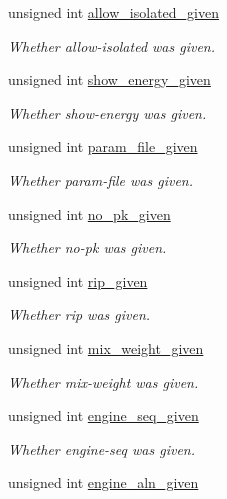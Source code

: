 \begin{DoxyCompactItemize}
unsigned int \hyperlink{structgengetopt__args__info_a8b05ab428edea135b106a9bcf40344ae}{allow\+\_\+isolated\+\_\+given}
\begin{DoxyCompactList}\small\item\em Whether allow-\/isolated was given. \end{DoxyCompactList}\item 
unsigned int \hyperlink{structgengetopt__args__info_a0d4a4466189dbba0719c55a398fb30fa}{show\+\_\+energy\+\_\+given}
\begin{DoxyCompactList}\small\item\em Whether show-\/energy was given. \end{DoxyCompactList}\item 
unsigned int \hyperlink{structgengetopt__args__info_acb50657bd03e25460c0fc7b2eda21c3a}{param\+\_\+file\+\_\+given}
\begin{DoxyCompactList}\small\item\em Whether param-\/file was given. \end{DoxyCompactList}\item 
unsigned int \hyperlink{structgengetopt__args__info_a6aa44a52828faad6c6d8ec6b4ab5494e}{no\+\_\+pk\+\_\+given}
\begin{DoxyCompactList}\small\item\em Whether no-\/pk was given. \end{DoxyCompactList}\item 
unsigned int \hyperlink{structgengetopt__args__info_ac307b1ec217df5ef31616c14a77627b3}{rip\+\_\+given}
\begin{DoxyCompactList}\small\item\em Whether rip was given. \end{DoxyCompactList}\item 
unsigned int \hyperlink{structgengetopt__args__info_ab6cdb68b59a319ba28d96f0e1899f720}{mix\+\_\+weight\+\_\+given}
\begin{DoxyCompactList}\small\item\em Whether mix-\/weight was given. \end{DoxyCompactList}\item 
unsigned int \hyperlink{structgengetopt__args__info_ab3cefd9fb1ccec8f27e55a6ab1c9acfb}{engine\+\_\+seq\+\_\+given}
\begin{DoxyCompactList}\small\item\em Whether engine-\/seq was given. \end{DoxyCompactList}\item 
unsigned int \hyperlink{structgengetopt__args__info_aabfb2ac097b504732bb06e9fec3ab25c}{engine\+\_\+aln\+\_\+given}

\end{DoxyCompactItemize}

